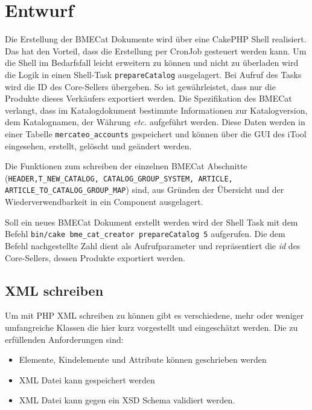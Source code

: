 	\section{Entwurf}

	Die Erstellung der BMECat Dokumente wird über eine CakePHP Shell realisiert. Das hat den Vorteil, dass die Erstellung per CronJob gesteuert werden kann. Um die Shell im Bedarfsfall leicht erweitern zu können und nicht zu überladen wird die Logik in einen Shell-Task \texttt{prepareCatalog} ausgelagert. Bei Aufruf des Tasks wird die ID des Core-Sellers übergeben. So ist gewährleistet, dass nur die Produkte dieses Verkäufers exportiert werden. Die Spezifikation des BMECat verlangt, dass im Katalogdokument bestimmte Informationen zur Katalogversion, dem Katalognamen, der Währung \textit{etc.} aufgeführt werden. Diese Daten werden in einer Tabelle \texttt{mercateo\_accounts} gespeichert und können über die GUI des iTool eingesehen, erstellt, gelöscht und geändert werden. 
	
	Die Funktionen zum schreiben der einzelnen BMECat Abschnitte (\texttt{HEADER,T\_NEW\_CATALOG, CATALOG\_GROUP\_SYSTEM, ARTICLE, ARTICLE\_TO\_CATALOG\_GROUP\_MAP}) sind, aus Gründen der Übersicht und der Wiederverwendbarkeit in ein Component ausgelagert.
	
	Soll ein neues BMECat Dokument erstellt werden wird der Shell Task mit dem Befehl \texttt{bin/cake bme\_cat\_creator prepareCatalog 5} aufgerufen. Die dem Befehl nachgestellte Zahl dient als Aufrufparameter und repräsentiert die \textit{id} des Core-Sellers, dessen Produkte exportiert werden.
	
	 
	
	
	
	
	\subsection{XML schreiben}
		
	Um mit PHP XML schreiben zu können gibt es verschiedene, mehr oder weniger umfangreiche Klassen die hier kurz vorgestellt und eingeschätzt werden.
	Die zu erfüllenden Anforderungen sind:
	\begin{itemize}
	\item Elemente, Kindelemente und Attribute können geschrieben werden
	\item XML Datei kann gespeichert werden
	\item XML Datei kann gegen ein XSD Schema validiert werden.
	\end{itemize}
	
